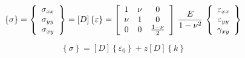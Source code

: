 \begin{equation*}
\left\{\sigma\right\}=\left\{
\begin{array}{c}
\sigma_{xx} \\
\sigma_{yy} \\
\sigma_{xy}
\end{array}
\right\}
=[D]\left\{\varepsilon\right\}=
\left[
\begin{array}{ccc}
\displaystyle 1 & \displaystyle \nu & 0\\
\displaystyle \nu & 1 & \large{0} \\
0& 0 & \frac{1-\nu}{2}
\end{array}
\right]\,
\frac{E}{1-\nu^2}\,
\left\{
\begin{array}{c}
\varepsilon_{xx} \\
\varepsilon_{yy} \\
\gamma_{xy}
\end{array}
\right\}
\end{equation*}

\begin{equation*}
    \left\{ \sigma\right\}=[D]\left\{ \varepsilon_0\right\}+z[D]\left\{ k\right\}
\end{equation*}


